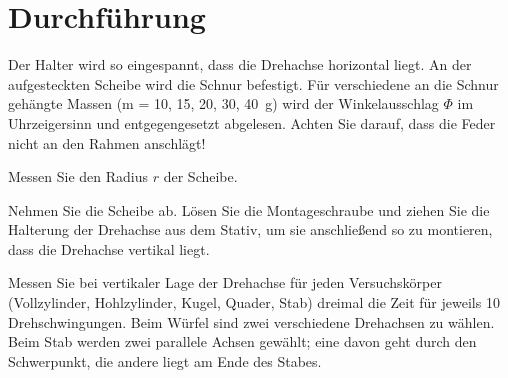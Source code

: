 \section{Durchführung} 

\begin{enumerate}
	\begin{minipage}{0.6\textwidth}
		\item Der Halter wird so eingespannt, dass die Drehachse horizontal liegt. An der aufgesteckten Scheibe wird die Schnur befestigt. Für verschiedene an die Schnur gehängte Massen (m = 10, 15, 20, 30, 40~g) wird der Winkelausschlag $\Phi$ im Uhrzeigersinn und entgegengesetzt abgelesen. Achten Sie darauf, dass die Feder nicht an den Rahmen anschlägt!
		\item Messen Sie den Radius $r$ der Scheibe.
		\item Nehmen Sie die Scheibe ab. Lösen Sie die Montageschraube und ziehen Sie die Halterung der Drehachse aus dem Stativ, um sie anschließend so zu montieren, dass die Drehachse vertikal liegt.
		\item Messen Sie bei vertikaler Lage der Drehachse für jeden Versuchskörper (Vollzylinder, Hohlzylinder, Kugel, Quader, Stab) dreimal die Zeit für jeweils 10 Drehschwingungen. Beim Würfel sind zwei verschiedene Drehachsen zu wählen. Beim Stab werden zwei parallele Achsen gewählt; eine davon geht durch den Schwerpunkt, die andere liegt am Ende des Stabes.
	\end{minipage}\hfill
	\begin{minipage}{0.35\textwidth}
		\centering

\end{minipage}
\end{enumerate}
